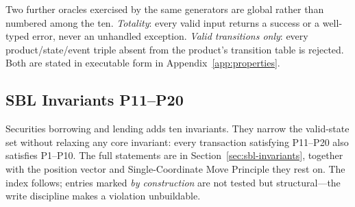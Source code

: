 Two further oracles exercised by the same generators are global rather than numbered among the ten. \emph{Totality}: every valid input returns a success or a well-typed error, never an unhandled exception. \emph{Valid transitions only}: every product/state/event triple absent from the product's transition table is rejected. Both are stated in executable form in Appendix~\ref{app:properties}.

\subsection{SBL Invariants P11--P20}
\label{sec:invariants-sbl}

Securities borrowing and lending adds ten invariants. They narrow the valid-state set without relaxing any core invariant: every transaction satisfying P11--P20 also satisfies P1--P10. The full statements are in Section~\ref{sec:sbl-invariants}, together with the position vector and Single-Coordinate Move Principle they rest on. The index follows; entries marked \emph{by construction} are not tested but structural---the write discipline makes a violation unbuildable.


